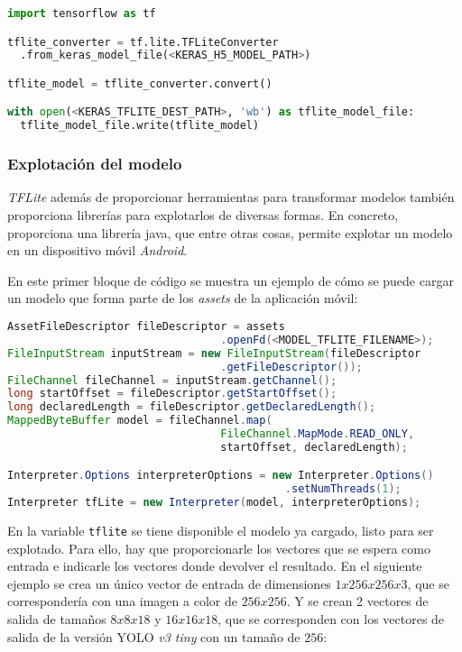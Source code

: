 \begin{lstlisting}[frame=single, basicstyle=\ttfamily\footnotesize, language=Python, caption={Cómo transformar un modelo entrenado con \textit{Keras} a formato \textit{TFLite}}, captionpos=b]
import tensorflow as tf

tflite_converter = tf.lite.TFLiteConverter
  .from_keras_model_file(<KERAS_H5_MODEL_PATH>)

tflite_model = tflite_converter.convert()

with open(<KERAS_TFLITE_DEST_PATH>, 'wb') as tflite_model_file:
  tflite_model_file.write(tflite_model)
\end{lstlisting}

\subsubsection*{Explotación del modelo}

\textit{TFLite} además de proporcionar herramientas para transformar modelos también proporciona librerías para explotarlos de diversas formas. En concreto, proporciona una librería java, que entre otras cosas, permite explotar un modelo en un dispositivo móvil \textit{Android}.

En este primer bloque de código se muestra un ejemplo de cómo se puede cargar un modelo que forma parte de los \textit{assets} de la aplicación móvil:

\begin{lstlisting}[frame=single, basicstyle=\ttfamily\footnotesize, language=Java, caption={Cómo cargar un modelo}, captionpos=b]
AssetFileDescriptor fileDescriptor = assets
                                 .openFd(<MODEL_TFLITE_FILENAME>);
FileInputStream inputStream = new FileInputStream(fileDescriptor
                                 .getFileDescriptor());
FileChannel fileChannel = inputStream.getChannel();
long startOffset = fileDescriptor.getStartOffset();
long declaredLength = fileDescriptor.getDeclaredLength();
MappedByteBuffer model = fileChannel.map(
                                 FileChannel.MapMode.READ_ONLY,
                                 startOffset, declaredLength);

Interpreter.Options interpreterOptions = new Interpreter.Options()
                                           .setNumThreads(1);
Interpreter tfLite = new Interpreter(model, interpreterOptions);
\end{lstlisting}

En la variable \texttt{tflite} se tiene disponible el modelo ya cargado, listo para ser explotado. Para ello, hay que proporcionarle los vectores que se espera como entrada e indicarle los vectores donde devolver el resultado. En el siguiente ejemplo se crea un único vector de entrada de dimensiones $1 x 256 x 256 x 3$, que se correspondería con una imagen a color de $256x256$. Y se crean 2 vectores de salida de tamaños $8 x 8 x 18$ y $16 x 16 x 18$, que se corresponden con los vectores de salida de la versión YOLO \textit{v3 tiny} con un tamaño de $256$:

